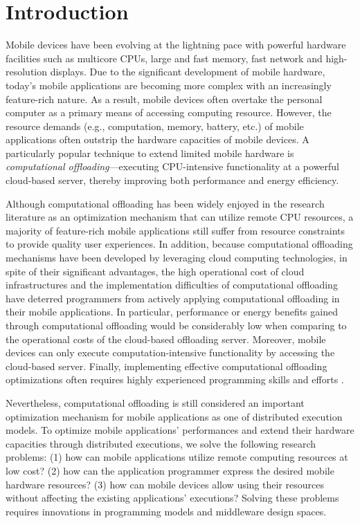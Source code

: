 \documentclass{sig-alternate}
\begin{document}
\section{Introduction}
Mobile devices have been evolving at the lightning pace with powerful hardware facilities such as multicore CPUs, large and fast memory, fast network and high-resolution displays. Due to the significant development of mobile hardware, today's mobile applications are becoming more complex with an increasingly feature-rich nature. As a result, mobile devices often overtake the personal computer as a primary means of accessing computing resource. However, the resource demands (e.g., computation, memory, battery, etc.) of mobile applications often outstrip the hardware capacities of mobile devices. A particularly popular technique to extend limited mobile hardware is \emph{computational offloading}---executing CPU-intensive functionality at a powerful cloud-based server, thereby improving both performance and energy efficiency. 

Although computational offloading has been widely enjoyed in the research literature as an optimization mechanism that can utilize remote CPU resources, a majority of feature-rich mobile applications still suffer from resource constraints to provide quality user experiences. In addition, because computational offloading mechanisms have been developed by leveraging cloud computing technologies, in spite of their significant advantages, the high operational cost of cloud infrastructures and the implementation difficulties of computational offloading have deterred programmers from actively applying computational offloading in their mobile applications. In particular, performance or energy benefits gained through computational offloading would be considerably low when comparing to the operational costs of the cloud-based offloading server. Moreover, mobile devices can only execute computation-intensive functionality by accessing the cloud-based server. Finally, implementing effective computational offloading optimizations often requires highly experienced programming skills and efforts \cite{kwon+:mobilesoft2015}.

Nevertheless, computational offloading is still considered an important optimization mechanism for mobile applications as one of distributed execution models. To optimize mobile applications' performances and extend their hardware capacities through distributed executions, we solve the following research problems: (1) how can mobile applications utilize remote computing resources at low cost? (2) how can the application programmer express the desired mobile hardware resources? (3) how can mobile devices allow using their resources without affecting the existing applications' executions? Solving these problems requires innovations in programming models and middleware design spaces. 
\end{document}
